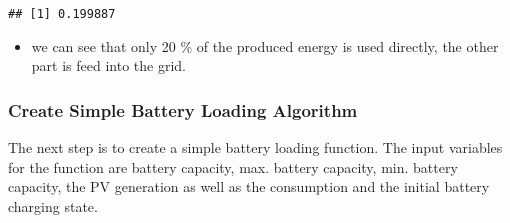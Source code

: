 \documentclass[
]{article}
\providecommand{\tightlist}{%
  \setlength{\itemsep}{0pt}\setlength{\parskip}{0pt}}
\begin{document}
\begin{verbatim}
## [1] 0.199887
\end{verbatim}

\begin{itemize}
\tightlist
\item
  we can see that only 20 \% of the produced energy is used directly,
  the other part is feed into the grid.
\end{itemize}

\hypertarget{create-simple-battery-loading-algorithm}{%
\subsubsection{Create Simple Battery Loading
Algorithm}\label{create-simple-battery-loading-algorithm}}

The next step is to create a simple battery loading function. The input
variables for the function are battery capacity, max. battery capacity,
min. battery capacity, the PV generation as well as the consumption and
the initial battery charging state.
\end{document}
